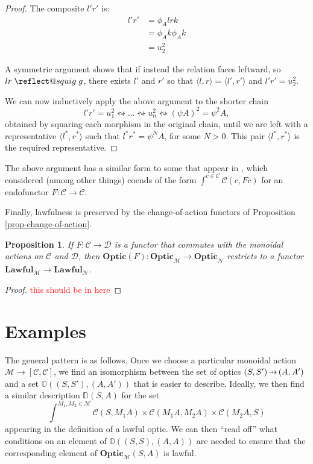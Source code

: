 \documentclass[11pt,a4paper]{article}
\makeatletter
\theoremstyle{plain}
\newtheorem{proposition}[theorem]{Proposition}
\theoremstyle{definition}
\newcommand{\C}{\mathscr{C}}
\newcommand{\D}{\mathscr{D}}
\newcommand{\M}{\mathscr{M}}
\newcommand{\N}{\mathscr{N}}
\newcommand{\Optic}{\mathbf{Optic}}
\newcommand{\Lawful}{\mathbf{Lawful}}
\newcommand{\hto}{\ensuremath{\,\mathaccent\shortmid\rightarrow\,}}
\providecommand{\leftsquigarrow}{%
  \mathrel{\mathpalette\reflect@squig\relax}%
}
\newcommand{\reflect@squig}[2]{%
  \reflectbox{$\m@th#1\rightsquigarrow$}%
}
\newcommand{\todo}[1]{\textcolor{red}{\small #1}}
\makeatother
\begin{document}
\begin{proof}
The composite $l'r'$ is:
\begin{align*}
l'r' &= \phi_A l r k \\
&= \phi_A k \phi_A k \\
&= u_2^2
\end{align*}

A symmetric argument shows that if instead the relation faces leftward, so $lr \leftsquigarrow g$, there exists $l'$ and $r'$ so that $\langle l, r \rangle = \langle l', r' \rangle$ and $l'r' = u_2^2$.

We can now inductively apply the above argument to the shorter chain \[l'r' = u_1^2 \leftrightsquigarrow \dots \leftrightsquigarrow u_n^2 \leftrightsquigarrow (\psi A)^2 = \psi^2 A,\] obtained by squaring each morphism in the original chain, until we are left with a representative $\langle l^*, r^* \rangle$ such that $l^*r^* = \psi^N A$, for some $N>0$. This pair $\langle l^*, r^* \rangle$ is the required representative.
\end{proof}

The above argument has a similar form to some that appear in \cite{OnTheTrace}, which considered (among other things) coends of the form $\int^{c \in \C} \C(c, Fc)$ for an endofunctor $F : \C \to \C$.

Finally, lawfulness is preserved by the change-of-action functors of Proposition \ref{prop-change-of-action}.

\begin{proposition}
If $F : \C \to \D$ is a functor that commutes with the monoidal actions on $\C$ and $\D$, then $\Optic(F) : \Optic_\M \to \Optic_\N$ restricts to a functor $\Lawful_\M \to \Lawful_\N$.
\end{proposition}
\begin{proof}
\todo{this should be in here}
\end{proof}

\section{Examples}
\label{lawful-examples}

The general pattern is as follows. Once we choose a particular monoidal action $\M \to [\C, \C]$, we find an isomorphism between the set of optics $(S, S') \hto (A, A')$ and a set $\mathbb{O}((S, S'), (A, A'))$ that is easier to describe. Ideally, we then find a similar description $\mathbb{D}(S, A)$ for the set \[ \int^{M_1, M_2 \in \M} \C(S, M_1 A) \times \C(M_1 A, M_2 A) \times \C(M_2 A, S)\] appearing in the definition of a lawful optic. We can then ``read off'' what conditions on an element of $\mathbb{O}((S, S), (A, A))$ are needed to ensure that the corresponding element of $\Optic_\M(S, A)$ is lawful.
\end{document}
